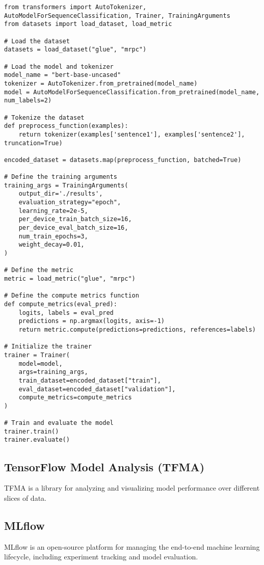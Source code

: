 \begin{verbatim}
from transformers import AutoTokenizer, AutoModelForSequenceClassification, Trainer, TrainingArguments
from datasets import load_dataset, load_metric

# Load the dataset
datasets = load_dataset("glue", "mrpc")

# Load the model and tokenizer
model_name = "bert-base-uncased"
tokenizer = AutoTokenizer.from_pretrained(model_name)
model = AutoModelForSequenceClassification.from_pretrained(model_name, num_labels=2)

# Tokenize the dataset
def preprocess_function(examples):
    return tokenizer(examples['sentence1'], examples['sentence2'], truncation=True)

encoded_dataset = datasets.map(preprocess_function, batched=True)

# Define the training arguments
training_args = TrainingArguments(
    output_dir='./results',
    evaluation_strategy="epoch",
    learning_rate=2e-5,
    per_device_train_batch_size=16,
    per_device_eval_batch_size=16,
    num_train_epochs=3,
    weight_decay=0.01,
)

# Define the metric
metric = load_metric("glue", "mrpc")

# Define the compute metrics function
def compute_metrics(eval_pred):
    logits, labels = eval_pred
    predictions = np.argmax(logits, axis=-1)
    return metric.compute(predictions=predictions, references=labels)

# Initialize the trainer
trainer = Trainer(
    model=model,
    args=training_args,
    train_dataset=encoded_dataset["train"],
    eval_dataset=encoded_dataset["validation"],
    compute_metrics=compute_metrics
)

# Train and evaluate the model
trainer.train()
trainer.evaluate()
\end{verbatim}

\subsection{TensorFlow Model Analysis (TFMA)}
TFMA is a library for analyzing and visualizing model performance over different slices of data.

\subsection{MLflow}
MLflow is an open-source platform for managing the end-to-end machine learning lifecycle, including experiment tracking and model evaluation.

